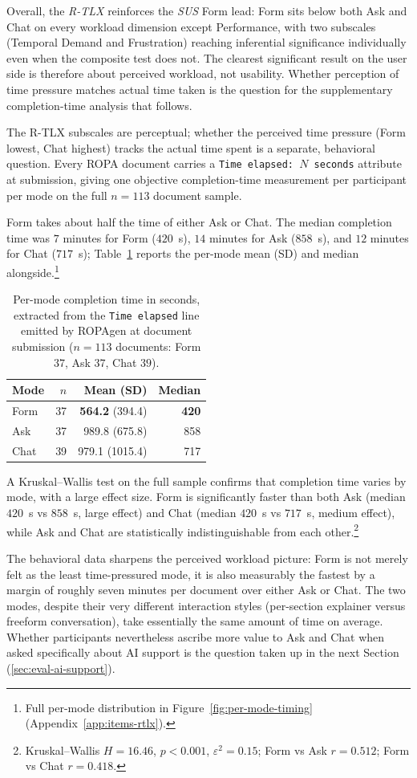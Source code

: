 Overall, the \textit{R-TLX} reinforces the \textit{SUS} Form lead: Form sits below
both Ask and Chat on every workload dimension except
Performance, with two subscales (Temporal Demand and Frustration)
reaching inferential significance individually even when the
composite test does not. The clearest significant result on the user side is
therefore about perceived workload, not usability.
Whether perception of time pressure matches actual
time taken is the question for the supplementary completion-time
analysis that follows.

The R-TLX subscales are perceptual; whether the perceived time
pressure (Form lowest, Chat highest) tracks the actual time spent
is a separate, behavioral question. Every ROPA document carries a
\texttt{Time elapsed: $N$ seconds} attribute at submission, giving
one objective completion-time measurement per participant per
mode on the full $n = 113$ document sample.

Form takes about half the time of either Ask or Chat. The
median completion time was $7$ minutes for Form ($420$~s), $14$
minutes for Ask ($858$~s), and $12$ minutes for Chat ($717$~s);
Table~\ref{tab:per-mode-timing} reports the per-mode mean (SD) and
median alongside.\footnote{Full per-mode distribution in
Figure~\ref{fig:per-mode-timing} (Appendix~\ref{app:items-rtlx}).}

\begin{table}[htbp]
\centering
\begin{tabular}{@{}l r r r@{}}
\toprule
Mode & $n$ & Mean (SD) & Median \\
\midrule
Form & 37 & \textbf{564.2} (394.4) & \textbf{420} \\
Ask  & 37 & 989.8 (675.8) & 858 \\
Chat & 39 & 979.1 (1015.4) & 717 \\
\bottomrule
\end{tabular}
\caption{Per-mode completion time in seconds, extracted from the
\texttt{Time elapsed} line emitted by ROPAgen at document
submission ($n = 113$ documents: Form $37$, Ask $37$, Chat $39$).}
\label{tab:per-mode-timing}
\end{table}

A Kruskal--Wallis test on the full sample confirms that
completion time varies by mode, with a large effect size. Form is
significantly faster than both Ask (median $420$~s vs $858$~s,
large effect) and Chat (median $420$~s vs $717$~s, medium
effect), while Ask and Chat are statistically indistinguishable
from each other.\footnote{Kruskal--Wallis $H = 16.46$,
$p < 0.001$, $\varepsilon^2 = 0.15$; Form vs Ask $r = 0.512$;
Form vs Chat $r = 0.418$.}

The behavioral data sharpens the perceived workload picture: Form
is not merely felt as the least time-pressured mode, it is also
measurably the fastest by a margin of roughly seven minutes per
document over either Ask or Chat. The two modes, despite their
very different interaction styles (per-section explainer versus
freeform conversation), take essentially the same amount of time
on average.
Whether participants nevertheless ascribe more value to Ask and
Chat when asked specifically about AI support is the
question taken up in the next Section (\ref{sec:eval-ai-support}).
